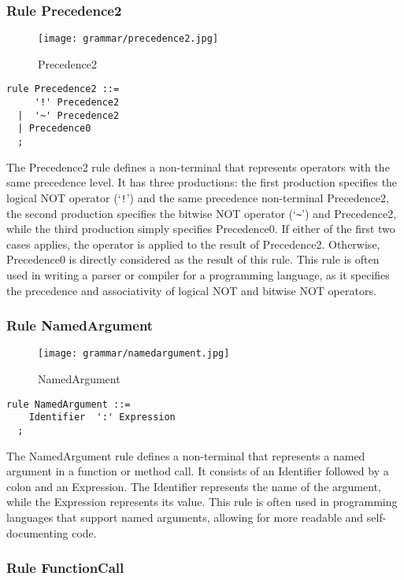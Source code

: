 \subsubsection*{Rule Precedence2}

\begin{figure}[!ht]
\centering
\texttt{[image: grammar/precedence2.jpg]}
\caption{Precedence2}
\end{figure}

\begin{lstlisting}
rule Precedence2 ::=
     '!' Precedence2 
  |  '~' Precedence2 
  | Precedence0 
  ;
\end{lstlisting}

The Precedence2 rule defines a non-terminal that represents operators with the same precedence level. It has three productions: the first production specifies the logical NOT operator (`\verb|!|') and the same precedence non-terminal Precedence2, the second production specifies the bitwise NOT operator (`\verb|~|') and Precedence2, while the third production simply specifies Precedence0. If either of the first two cases applies, the operator is applied to the result of Precedence2. Otherwise, Precedence0 is directly considered as the result of this rule. This rule is often used in writing a parser or compiler for a programming language, as it specifies the precedence and associativity of logical NOT and bitwise NOT operators.
\subsubsection*{Rule NamedArgument}

\begin{figure}[!ht]
\centering
\texttt{[image: grammar/namedargument.jpg]}
\caption{NamedArgument}
\end{figure}

\begin{lstlisting}
rule NamedArgument ::=
    Identifier  ':' Expression 
  ;
\end{lstlisting}

The NamedArgument rule defines a non-terminal that represents a named argument in a function or method call. It consists of an Identifier followed by a colon and an Expression. The Identifier represents the name of the argument, while the Expression represents its value. This rule is often used in programming languages that support named arguments, allowing for more readable and self-documenting code.

\subsubsection*{Rule FunctionCall}

